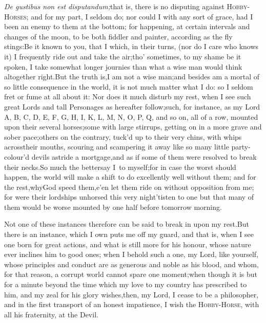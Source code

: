 \documentclass{article}
\begin{document}
\quad\tsk \textit{De gustibus non est
disputandum;}\break\tsk  that is, there is no disputing against
\textsc{Hobby-Horses}; and for my part, I
seldom do; nor could I with any sort of grace, had I been an enemy
to them at the bottom; for happening, at certain intervals and
changes of the moon, to be both fiddler and painter, according as
the fly stings:\tsk  Be it known to you, that I\pb
{}
which, in their turns, (nor do I care who knows
it) I frequently ride out and take 
the air;\tsk  tho’ sometimes, to my shame\break
be it spoken, I take somewhat longer\break
journies than what a wise man would\break
think altogether right.\tsk  But the truth\break
is,\tsk  I am not a wise man;\tsk  and besides am a mortal of so little consequence in the world,
it is not much matter what I do: so I seldom fret or fume at all
about it: Nor does it much disturb my rest, when I see such great
Lords and tall Personages as hereafter follow;\tsk  such, for
instance, as my Lord A, B, C, D, E, F, G, H, I, K, L, M, N, O, P,
Q, and so on, all of a row, mounted upon their several
horses;\tsk  some with large stirrups, getting on in a more grave
and sober pace;\tsh  others on the contrary, tuck’d up to
their very chins, with whips across\pb their mouths, scouring and
scampering it away like so many little party-colour’d devils
astride a mortgage,\tsh  and as if\break
some of them were resolved to break\break
their necks.\tsh  So much the better\tsk  say\break
I~to myself;\tsk  for in case the worst should happen, the world will
make a shift to do excellently well without them; and for the
rest,\tsh  why\tsh  God speed
them,\tsk  e’en let them ride on without opposition
from me; for were their lordships unhorsed this very
night\tsk  ’tis\break ten to one but that many of them would
be worse mounted by one half before tomorrow
morning.

Not one of these instances therefore can be said to break in
upon my rest.\tsk\break  But there is an instance, which I own
puts me off my guard, and that is, when I see one born for great
actions, and what is still more for his honour, whose nature ever
inclines him to good ones;\tsh\break  
when I behold such a one, my Lord,
like yourself, whose principles and conduct are as generous and
noble as his blood, and whom, for that reason, a corrupt world
cannot spare one moment;\tsk  when 
though it is but for a minute beyond the time which my
love to my country has prescribed to him, and my zeal for his glory
wishes,\tsk  then, my Lord, I cease to be a philosopher, and in
the first transport of an honest impatience, I wish the
\textsc{Hobby-Horse}, with all his fraternity,
at the Devil.
\end{document}
